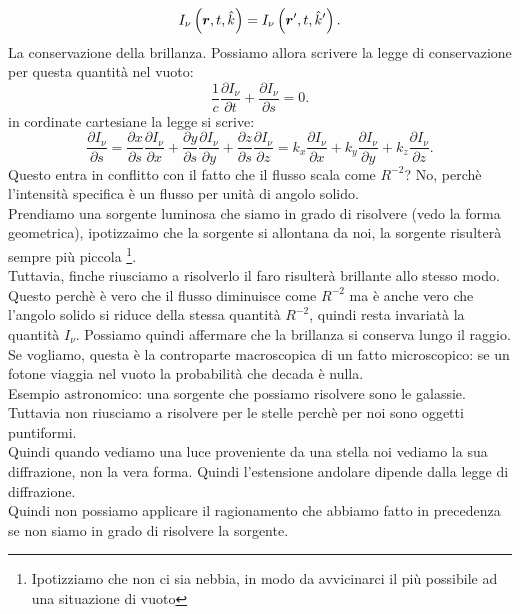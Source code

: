 \[
	I_{\nu}\left( \boldsymbol{r}, t, \hat{k} \right) =I_{\nu}\left( \boldsymbol{r}', t, \hat{k}' \right)
.\] 
La conservazione della brillanza. Possiamo allora scrivere la legge di conservazione per questa quantità nel vuoto:
\[
	\frac{1}{c}\frac{\partial I_{\nu}}{\partial t} + \frac{\partial I_{\nu}}{\partial s}  = 0
.\] 
in cordinate cartesiane la legge si scrive:
\[
	\frac{\partial I_{\nu}}{\partial s} =
	\frac{\partial x}{\partial s} \frac{\partial I_{\nu}}{\partial x} + 
	\frac{\partial y}{\partial s} \frac{\partial I_{\nu}}{\partial y} +
	\frac{\partial z}{\partial s} \frac{\partial I_{\nu}}{\partial z}= 
	k_{x} \frac{\partial I_{\nu}}{\partial x} + 
	k_{y}\frac{\partial I_{\nu}}{\partial y} + 
	k_{z}\frac{\partial I_{\nu}}{\partial z}  
.\] 
Questo entra in conflitto con il fatto che il flusso scala come $R^{-2}$? No, perchè l'intensità specifica è un flusso per unità di angolo solido. \\
Prendiamo una sorgente luminosa che siamo in grado di risolvere (vedo la forma geometrica), ipotizzaimo che la sorgente si allontana da noi, la sorgente risulterà sempre più piccola \footnote{Ipotizziamo che non ci sia nebbia, in modo da avvicinarci il più possibile ad una situazione di vuoto}.\\
Tuttavia, finche riusciamo a risolverlo il faro risulterà brillante allo stesso modo. Questo perchè è vero che il flusso diminuisce come $R^{-2}$ ma è anche vero che  l'angolo solido si riduce della stessa quantità $R^{-2}$, quindi resta invariatà la quantità $I_{\nu}$. Possiamo quindi affermare che la brillanza si conserva lungo il raggio.\\
Se vogliamo, questa è la controparte macroscopica di un fatto microscopico: se un fotone viaggia nel vuoto la probabilità che decada è nulla.\\
Esempio astronomico: una sorgente che possiamo risolvere sono le galassie. Tuttavia non riusciamo a risolvere per le stelle perchè per noi sono oggetti puntiformi.\\
Quindi quando vediamo una luce proveniente da una stella noi vediamo la sua diffrazione, non la vera forma. Quindi l'estensione andolare dipende dalla legge di diffrazione.\\
Quindi non possiamo applicare il ragionamento che abbiamo fatto in precedenza se non siamo in grado di risolvere la sorgente.\\
